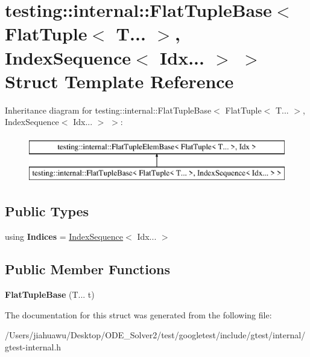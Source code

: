 \hypertarget{structtesting_1_1internal_1_1_flat_tuple_base_3_01_flat_tuple_3_01_t_8_8_8_01_4_00_01_index_sequence_3_01_idx_8_8_8_01_4_01_4}{}\section{testing\+:\+:internal\+:\+:Flat\+Tuple\+Base$<$ Flat\+Tuple$<$ T... $>$, Index\+Sequence$<$ Idx... $>$ $>$ Struct Template Reference}
\label{structtesting_1_1internal_1_1_flat_tuple_base_3_01_flat_tuple_3_01_t_8_8_8_01_4_00_01_index_sequence_3_01_idx_8_8_8_01_4_01_4}
Inheritance diagram for testing\+:\+:internal\+:\+:Flat\+Tuple\+Base$<$ Flat\+Tuple$<$ T... $>$, Index\+Sequence$<$ Idx... $>$ $>$\+:\begin{figure}[H]
\begin{center}
\leavevmode
\includegraphics[height=2.000000cm]{structtesting_1_1internal_1_1_flat_tuple_base_3_01_flat_tuple_3_01_t_8_8_8_01_4_00_01_index_sequence_3_01_idx_8_8_8_01_4_01_4}
\end{center}
\end{figure}
\subsection*{Public Types}
\begin{DoxyCompactItemize}
\item 
\mbox{\label{structtesting_1_1internal_1_1_flat_tuple_base_3_01_flat_tuple_3_01_t_8_8_8_01_4_00_01_index_sequence_3_01_idx_8_8_8_01_4_01_4_ada1941ebde1ec1c844b72970e0ccb304}} 
using {\bfseries Indices} = \mbox{\hyperlink{structtesting_1_1internal_1_1_index_sequence}{Index\+Sequence}}$<$ Idx... $>$
\end{DoxyCompactItemize}
\subsection*{Public Member Functions}
\begin{DoxyCompactItemize}
\item 
\mbox{\label{structtesting_1_1internal_1_1_flat_tuple_base_3_01_flat_tuple_3_01_t_8_8_8_01_4_00_01_index_sequence_3_01_idx_8_8_8_01_4_01_4_ac515eec5c0647748bf8fa4ff553c706e}} 
{\bfseries Flat\+Tuple\+Base} (T... t)
\end{DoxyCompactItemize}


The documentation for this struct was generated from the following file\+:\begin{DoxyCompactItemize}
\item 
/\+Users/jiahuawu/\+Desktop/\+O\+D\+E\+\_\+\+Solver2/test/googletest/include/gtest/internal/gtest-\/internal.\+h\end{DoxyCompactItemize}
